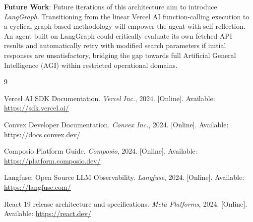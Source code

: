 \documentclass[12pt,a4paper]{article}
\begin{document}
\textbf{Future Work}: Future iterations of this architecture aim to introduce \textit{LangGraph}. Transitioning from the linear Vercel AI function-calling execution to a cyclical graph-based methodology will empower the agent with self-reflection. An agent built on LangGraph could critically evaluate its own fetched API results and automatically retry with modified search parameters if initial responses are unsatisfactory, bridging the gap towards full Artificial General Intelligence (AGI) within restricted operational domains.

\newpage
\begin{thebibliography}{9}

Vercel AI SDK Documentation. \textit{Vercel Inc.}, 2024. [Online]. Available: \url{https://sdk.vercel.ai/}

Convex Developer Documentation. \textit{Convex Inc.}, 2024. [Online]. Available: \url{https://docs.convex.dev/}

Composio Platform Guide. \textit{Composio}, 2024. [Online]. Available: \url{https://platform.composio.dev/}

Langfuse: Open Source LLM Observability. \textit{Langfuse}, 2024. [Online]. Available: \url{https://langfuse.com/}

React 19 release architecture and specifications. \textit{Meta Platforms}, 2024. [Online]. Available: \url{https://react.dev/}

\end{thebibliography}
\end{document}
